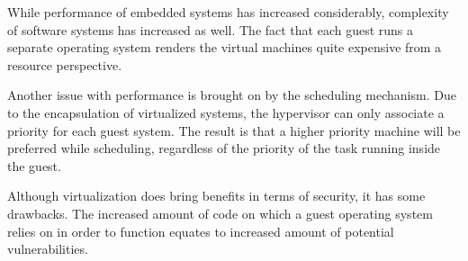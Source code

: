 While performance of embedded systems has increased considerably, complexity of software systems has increased as well. The fact that each guest runs a separate operating system renders the virtual machines quite expensive from a resource perspective.

Another issue with performance is brought on by the scheduling mechanism. Due to the encapsulation of virtualized systems, the hypervisor can only associate a priority for each guest system. The result is that a higher priority machine will be preferred while scheduling, regardless of the priority of the task running inside the guest\cite{virt-embedded}.

Although virtualization does bring benefits in terms of security, it has some drawbacks. The increased amount of code on which a guest operating system relies on in order to function equates to increased amount of potential vulnerabilities.

